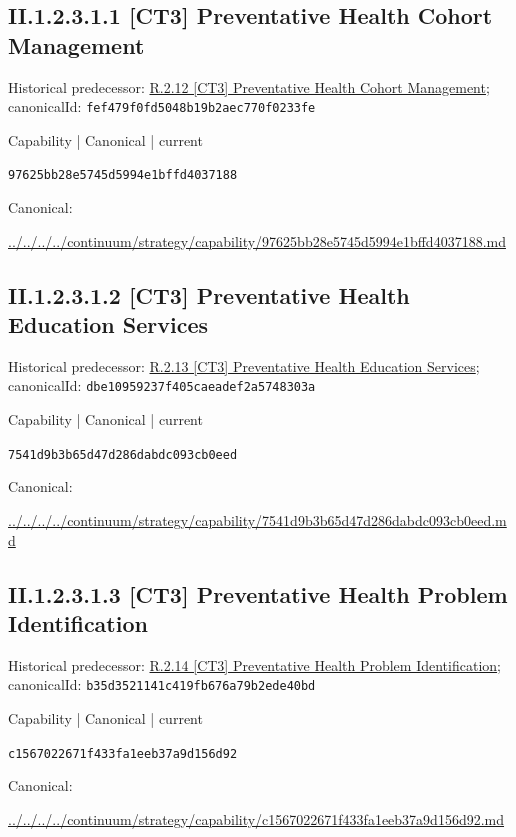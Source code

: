 \documentclass[10pt,a4paper]{article}
\begin{document}
\subsection*{II.1.2.3.1.1 [CT3] Preventative Health Cohort Management}
Historical predecessor: \hyperref[element-fef479f0fd5048b19b2aec770f0233fe]{R.2.12 [CT3] Preventative Health Cohort Management}; canonicalId: \texttt{fef479f0fd5048b19b2aec770f0233fe}\par
\label{element-97625bb28e5745d5994e1bffd4037188}
{\small Capability | Canonical | current}\par
\texttt{97625bb28e5745d5994e1bffd4037188}\par
Canonical: \par
{\footnotesize\url{../../../../continuum/strategy/capability/97625bb28e5745d5994e1bffd4037188.md}}\par
\subsection*{II.1.2.3.1.2 [CT3] Preventative Health Education Services}
Historical predecessor: \hyperref[element-dbe10959237f405caeadef2a5748303a]{R.2.13 [CT3] Preventative Health Education Services}; canonicalId: \texttt{dbe10959237f405caeadef2a5748303a}\par
\label{element-7541d9b3b65d47d286dabdc093cb0eed}
{\small Capability | Canonical | current}\par
\texttt{7541d9b3b65d47d286dabdc093cb0eed}\par
Canonical: \par
{\footnotesize\url{../../../../continuum/strategy/capability/7541d9b3b65d47d286dabdc093cb0eed.md}}\par
\subsection*{II.1.2.3.1.3 [CT3] Preventative Health Problem Identification}
Historical predecessor: \hyperref[element-b35d3521141c419fb676a79b2ede40bd]{R.2.14 [CT3] Preventative Health Problem Identification}; canonicalId: \texttt{b35d3521141c419fb676a79b2ede40bd}\par
\label{element-c1567022671f433fa1eeb37a9d156d92}
{\small Capability | Canonical | current}\par
\texttt{c1567022671f433fa1eeb37a9d156d92}\par
Canonical: \par
{\footnotesize\url{../../../../continuum/strategy/capability/c1567022671f433fa1eeb37a9d156d92.md}}\par
\end{document}
